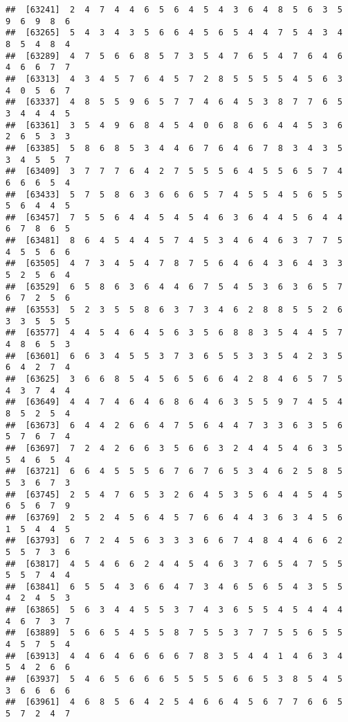 \documentclass[
]{book}
\begin{document}
\begin{verbatim}
##  [63241]  2  4  7  4  4  6  5  6  4  5  4  3  6  4  8  5  6  3  5  9  6  9  8  6
##  [63265]  5  4  3  4  3  5  6  6  4  5  6  5  4  4  7  5  4  3  4  8  5  4  8  4
##  [63289]  4  7  5  6  6  8  5  7  3  5  4  7  6  5  4  7  6  4  6  4  6  6  7  7
##  [63313]  4  3  4  5  7  6  4  5  7  2  8  5  5  5  5  4  5  6  3  4  0  5  6  7
##  [63337]  4  8  5  5  9  6  5  7  7  4  6  4  5  3  8  7  7  6  5  3  4  4  4  5
##  [63361]  3  5  4  9  6  8  4  5  4  0  6  8  6  6  4  4  5  3  6  2  6  5  3  3
##  [63385]  5  8  6  8  5  3  4  4  6  7  6  4  6  7  8  3  4  3  5  3  4  5  5  7
##  [63409]  3  7  7  7  6  4  2  7  5  5  5  6  4  5  5  6  5  7  4  6  6  6  5  4
##  [63433]  5  7  5  8  6  3  6  6  6  5  7  4  5  5  4  5  6  5  5  5  6  4  4  5
##  [63457]  7  5  5  6  4  4  5  4  5  4  6  3  6  4  4  5  6  4  4  6  7  8  6  5
##  [63481]  8  6  4  5  4  4  5  7  4  5  3  4  6  4  6  3  7  7  5  4  5  5  6  6
##  [63505]  4  7  3  4  5  4  7  8  7  5  6  4  6  4  3  6  4  3  3  5  2  5  6  4
##  [63529]  6  5  8  6  3  6  4  4  6  7  5  4  5  3  6  3  6  5  7  6  7  2  5  6
##  [63553]  5  2  3  5  5  8  6  3  7  3  4  6  2  8  8  5  5  2  6  3  3  5  5  5
##  [63577]  4  4  5  4  6  4  5  6  3  5  6  8  8  3  5  4  4  5  7  4  8  6  5  3
##  [63601]  6  6  3  4  5  5  3  7  3  6  5  5  3  3  5  4  2  3  5  6  4  2  7  4
##  [63625]  3  6  6  8  5  4  5  6  5  6  6  4  2  8  4  6  5  7  5  4  3  7  4  4
##  [63649]  4  4  7  4  6  4  6  8  6  4  6  3  5  5  9  7  4  5  4  8  5  2  5  4
##  [63673]  6  4  4  2  6  6  4  7  5  6  4  4  7  3  3  6  3  5  6  5  7  6  7  4
##  [63697]  7  2  4  2  6  6  3  5  6  6  3  2  4  4  5  4  6  3  5  5  4  6  5  4
##  [63721]  6  6  4  5  5  5  6  7  6  7  6  5  3  4  6  2  5  8  5  5  3  6  7  3
##  [63745]  2  5  4  7  6  5  3  2  6  4  5  3  5  6  4  4  5  4  5  6  5  6  7  9
##  [63769]  2  5  2  4  5  6  4  5  7  6  6  4  4  3  6  3  4  5  6  1  5  4  4  5
##  [63793]  6  7  2  4  5  6  3  3  3  6  6  7  4  8  4  4  6  6  2  5  5  7  3  6
##  [63817]  4  5  4  6  6  2  4  4  5  4  6  3  7  6  5  4  7  5  5  5  5  7  4  4
##  [63841]  6  5  5  4  3  6  6  4  7  3  4  6  5  6  5  4  3  5  5  4  2  4  5  3
##  [63865]  5  6  3  4  4  5  5  3  7  4  3  6  5  5  4  5  4  4  4  4  6  7  3  7
##  [63889]  5  6  6  5  4  5  5  8  7  5  5  3  7  7  5  5  6  5  5  4  5  7  5  4
##  [63913]  4  4  6  4  6  6  6  6  7  8  3  5  4  4  1  4  6  3  4  5  4  2  6  6
##  [63937]  5  4  6  5  6  6  6  5  5  5  5  6  6  5  3  8  5  4  5  3  6  6  6  6
##  [63961]  4  6  8  5  6  4  2  5  4  6  6  4  5  6  7  7  6  6  5  5  7  2  4  7

\end{verbatim}
\end{document}
